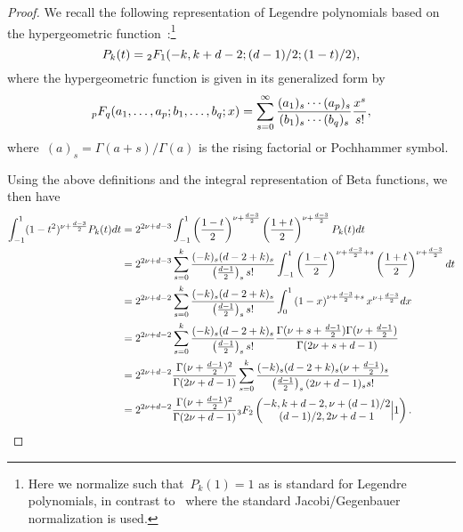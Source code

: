 \begin{proof}
We recall the following representation of Legendre polynomials based on the hypergeometric function~\citep[\eg,][Section 4.5]{ismail2005classical}:\footnote{Here we normalize such that~$P_k(1)=1$ as is standard for Legendre polynomials, in contrast to~\citep{ismail2005classical} where the standard Jacobi/Gegenbauer normalization is used.}
\begin{equation}
P_k(t) = {}_{2}F_{1}(-k,k+d-2;(d-1)/2;(1-t)/2),
\end{equation}
where the hypergeometric function is given in its generalized form by
\begin{equation}
{}_{p}F_{q}(a_1, \ldots, a_p;b_1, \ldots, b_q;x)
= \sum_{s=0}^\infty \frac{(a_1)_s \cdots (a_p)_s}{(b_1)_s \cdots (b_q)_s} \frac{x^s}{s!},
\end{equation}
where~$(a)_s = \Gamma(a+s)/\Gamma(a)$ is the rising factorial or Pochhammer symbol.

Using the above definitions and the integral representation of Beta functions, we then have
\begin{align*}
\int_{-1}^1 (1-t^2)^{\nu + \frac{d-3}{2}} P_k(t) dt
	&= 2^{2 \nu + d - 3} \int_{-1}^1 \left(\frac{1-t}{2}\right)^{\nu + \frac{d-3}{2}} \left(\frac{1+t}{2}\right)^{\nu + \frac{d-3}{2}} P_k(t) dt \\
	&= 2^{2 \nu + d - 3} \sum_{s=0}^k \frac{(-k)_s (d-2+k)_s}{\left( \frac{d-1}{2}\right)_s s!} \int_{-1}^1 \left(\frac{1-t}{2}\right)^{\nu + \frac{d-3}{2} + s} \left(\frac{1+t}{2}\right)^{\nu + \frac{d-3}{2}} dt \\
	&= 2^{2 \nu + d - 2} \sum_{s=0}^k \frac{(-k)_s (d-2+k)_s}{\left( \frac{d-1}{2}\right)_s s!} \int_{0}^1 \left(1-x\right)^{\nu + \frac{d-3}{2} + s} x^{\nu + \frac{d-3}{2}} dx \\
	&= 2^{2 \nu + d - 2} \sum_{s=0}^k \frac{(-k)_s (d-2+k)_s}{\left( \frac{d-1}{2}\right)_s s!} \frac{\Gamma(\nu +s + \frac{d-1}{2}) \Gamma(\nu + \frac{d-1}{2})}{\Gamma(2 \nu + s + d - 1)} \\
	&= 2^{2 \nu + d - 2} \frac{\Gamma(\nu + \frac{d-1}{2})^2}{\Gamma(2 \nu + d - 1)} \sum_{s=0}^k \frac{(-k)_s (d-2+k)_s (\nu + \frac{d-1}{2})_s}{\left( \frac{d-1}{2}\right)_s (2 \nu + d - 1)_s s!} \\
	&= 2^{2 \nu + d - 2} \frac{\Gamma(\nu + \frac{d-1}{2})^2}{\Gamma(2 \nu + d - 1)} {}_{3}F_{2}\left(\begin{matrix}
		-k,k+d-2, \nu + (d-1)/2 \\ (d-1)/2, 2 \nu + d - 1
	\end{matrix}\Big| 1 \right).
\end{align*}


\end{proof}
